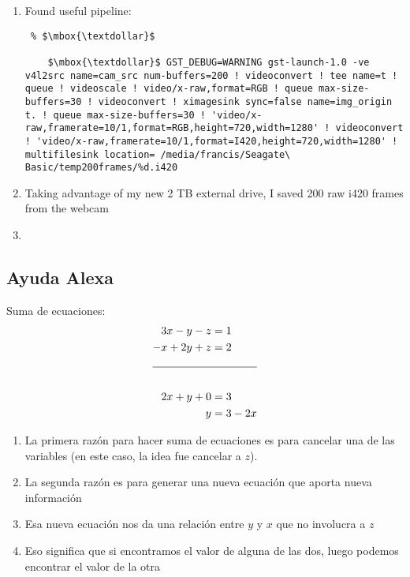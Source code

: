 \documentclass[12pt,oneside]{book}
\begin{document}
\begin{enumerate}
\begin{lstlisting}
    $\mbox{\textdollar}$ gst-inspect-1.0 v4l2src
      video/x-raw
        format: { (string)RGB16, (string)BGR, (string)RGB, (string)GRAY8, (string)
          GRAY16_LE, (string)GRAY16_BE, (string)YVU9, (string)YV12, (string)YUY2,
          (string)YVYU, (string)UYVY, (string)Y42B, (string)Y41B, (string)YUV9,
          (string)NV12_64Z32, (string)NV24, (string)NV61, (string)NV16, (string)
          NV21, (string)NV12, (string)I420, (string)BGRA, (string)BGRx, (string )
          ARGB, (string)xRGB, (string)BGR15, (string)RGB15 }
    $\mbox{\textdollar}$ gst-inspect-1.0 xvimagesink  
      video/x-raw
        framerate: [ 0/1, 2147483647/1 ]
        width: [ 1, 2147483647 ]
        height: [ 1, 2147483647 ]
      \end{lstlisting}
  \item Found useful pipeline:
  \begin{lstlisting} % $\mbox{\textdollar}$

    $\mbox{\textdollar}$ GST_DEBUG=WARNING gst-launch-1.0 -ve v4l2src name=cam_src num-buffers=200 ! videoconvert ! tee name=t ! queue ! videoscale ! video/x-raw,format=RGB ! queue max-size-buffers=30 ! videoconvert ! ximagesink sync=false name=img_origin t. ! queue max-size-buffers=30 ! 'video/x-raw,framerate=10/1,format=RGB,height=720,width=1280' ! videoconvert ! 'video/x-raw,framerate=10/1,format=I420,height=720,width=1280' ! multifilesink location= /media/francis/Seagate\ Basic/temp200frames/%d.i420
  \end{lstlisting}
  \item Taking advantage of my new 2 TB external drive, I saved 200 raw i420 frames from the webcam
  \item 
\end{enumerate}


\subsection*{Ayuda Alexa}

Suma de ecuaciones:
\begin{align*}
  3x -  y - z &= 1 \\
  -x + 2y + z &= 2 \\
  \cline{1-2} \\
  2x + y + 0 &= 3 \\
  y &= 3 - 2x
\end{align*}

\begin{enumerate}
  \item La primera razón para hacer suma de ecuaciones es para cancelar una de las variables (en este caso, la idea fue cancelar a $z$).
  \item La segunda razón es para generar una nueva ecuación que aporta nueva información
  \item Esa nueva ecuación nos da una relación entre $y$ y $x$ que no involucra a $z$
  \item Eso significa que si encontramos el valor de alguna de las dos, luego podemos encontrar el valor de la otra
\end{enumerate}
\end{document}
